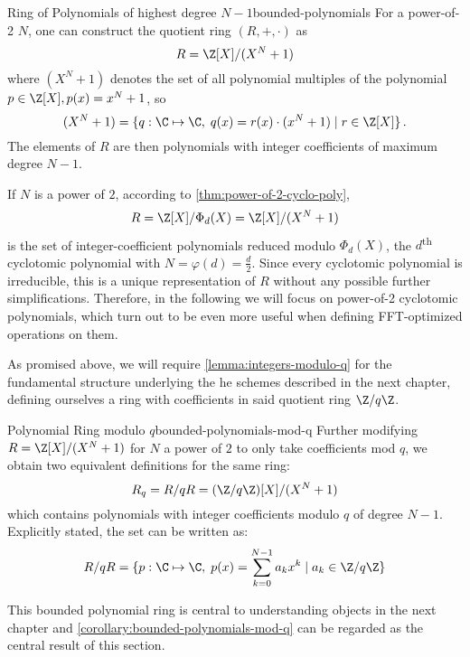 \begin{definition}{Ring of Polynomials of highest degree $N-1$}{bounded-polynomials}
  For a power-of-2 $N$, one can construct the quotient ring $(R, +, \cdot)$ as
  $$R = \Z[X] / (X^N + 1)$$
  where $(X^N + 1)$ denotes the set of all polynomial multiples of the polynomial $p \in \Z[X], p(x) = x^N + 1$, so
  $$(X^N+1) = \{q: \C \mapsto \C,\; q(x) = r(x) \cdot (x^N+1) \;|\; r \in \Z[X]\} \,.$$
  The elements of $R$ are then polynomials with integer coefficients of maximum degree $N-1$.
\end{definition}

If $N$ is a power of $2$, according to \cref{thm:power-of-2-cyclo-poly}, $$R = \Z[X] / \Phi_d(X) = \Z[X] / (X^N + 1)$$ is the set of integer-coefficient polynomials reduced modulo $\Phi_d(X)$, the $d$\textsuperscript{th} cyclotomic polynomial with $N = \varphi(d) = \frac{d}{2}$.
Since every cyclotomic polynomial is irreducible, this is a unique representation of $R$ without any possible further simplifications.
Therefore, in the following we will focus on power-of-2 cyclotomic polynomials, which turn out to be even more useful when defining FFT-optimized operations on them.

As promised above, we will require \cref{lemma:integers-modulo-q} for the fundamental structure underlying the \gls{he} schemes described in the next chapter, defining ourselves a ring with coefficients in said quotient ring $\Z/q\Z$.

\begin{corollary}{Polynomial Ring modulo $q$}{bounded-polynomials-mod-q}
  Further modifying $R = \Z[X] / (X^N+1)$ for $N$ a power of $2$ to only take coefficients mod $q$, we obtain two equivalent definitions for the same ring:
  $$R_q = R/qR = (\Z/q\Z)[X] / (X^N+1)$$
  which contains polynomials with integer coefficients modulo $q$ of degree $N-1$.
  Explicitly stated, the set can be written as:
  $$R/qR = \{p: \C \mapsto \C,\; p(x) = \sum_{k=0}^{N-1} a_k x^k \;|\; a_k \in \Z/q\Z\}$$
\end{corollary}

This bounded polynomial ring is central to understanding objects in the next chapter and \cref{corollary:bounded-polynomials-mod-q} can be regarded as the central result of this section.

\pagebreak
